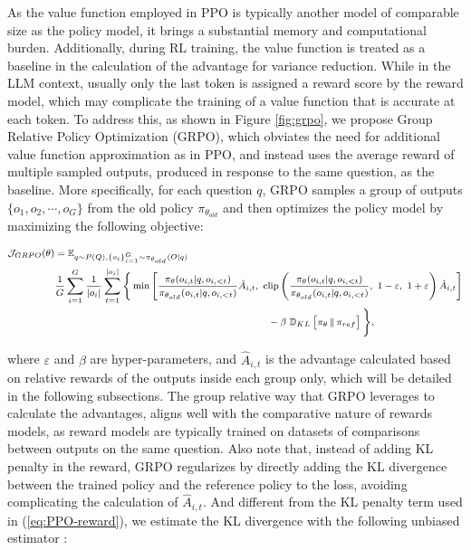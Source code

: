 \begin{itemize}[topsep=0pt]
\begin{itemize}[topsep=0pt]
As the value function employed in PPO is typically another model of comparable size as the policy model, it brings a substantial memory and computational burden. Additionally, during RL training, the value function is treated as a baseline in the calculation of the advantage for variance reduction. While in the LLM context, usually only the last token is assigned a reward score by the reward model, which may complicate the training of a value function that is accurate at each token. To address this, as shown in Figure \ref{fig:grpo}, we propose Group Relative Policy Optimization (GRPO), which obviates the need for additional value function approximation as in PPO, and instead uses the average reward of multiple sampled outputs, produced in response to the same question, as the baseline. More specifically, for each question $q$, GRPO samples a group of outputs $\{o_1, o_2, \cdots, o_G\}$  from the old policy  $\pi_{\theta_{old}}$  and then optimizes the policy model by maximizing the following objective:

\begin{equation}
\footnotesize
\begin{split}
    \mathcal{J}_{GRPO}(\theta) &= \mathbb{E}_{q \sim P(Q), \{o_i\}_{i=1}^G \sim \pi_{\theta_{old}}(O|q)}  \\
    & \frac{1}{G}\sum_{i=1}^G\frac{1}{|o_i|} \sum_{t=1}^{|o_i|} \Bigg\{ \min \left[ \frac{\pi_\theta(o_{i,t} | q, o_{i,<t})}{\pi_{\theta_{old}}(o_{i,t} | q, o_{i,<t})} \hat{A}_{i,t},\ \text{clip}\left( \frac{\pi_\theta(o_{i,t} | q, o_{i,<t})}{\pi_{\theta_{old}}(o_{i,t} | q, o_{i,<t})},\ 1 - \varepsilon,\ 1 + \varepsilon \right) \hat{A}_{i,t} \right] \\
    & \hspace{6.4cm} - \beta\ \mathbb{D}_{KL} \left[ \pi_{\theta} \,\|\, \pi_{ref} \right] \Bigg\},
\end{split}
\label{eq:GRPO-obj}
\end{equation}

where $\varepsilon$ and $\beta$ are hyper-parameters, and $\hat{A}_{i,t}$  is the advantage calculated based on relative rewards of the outputs inside each group only, which will be detailed in the following subsections. The group relative way that GRPO leverages to calculate the advantages, aligns well with the comparative nature of rewards models,  as reward models are typically trained on datasets of comparisons between outputs on the same question. Also note that, instead of adding KL penalty in the reward, GRPO regularizes by directly adding the KL divergence between the trained policy and the reference policy to the loss, avoiding complicating the calculation of  $\hat{A}_{i,t}$. And different from the KL penalty term used in (\ref{eq:PPO-reward}), we estimate the KL divergence with the following unbiased estimator \citep{kl_approx}:


\end{itemize}
\end{itemize}
